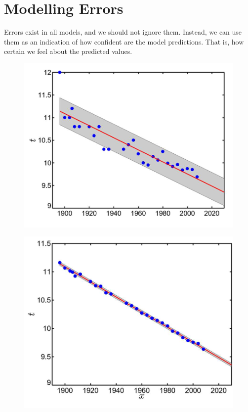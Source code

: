 \documentclass[12pt]{article}
\begin{document}
\newpage
\section{Modelling Errors}

Errors exist in all models, and we should not ignore them. Instead, we can use them as an indication of how confident are the model predictions. That is, how certain we feel about the predicted values.
\vspace{1.5em}

\begin{figure}[h]
\centering

\begin{minipage}[b]{0.4\linewidth}
  \centering
  \includegraphics[width=\linewidth]{images/lecture_03/img_3.png}
  \label{fig:img_3}
\end{minipage}
\hspace{0.03\linewidth}
\begin{minipage}[b]{0.4\linewidth}
  \centering
  \includegraphics[width=\linewidth]{images/lecture_03/img_4.png}
  \label{fig:img_4}
\end{minipage}

\end{figure}
\end{document}
